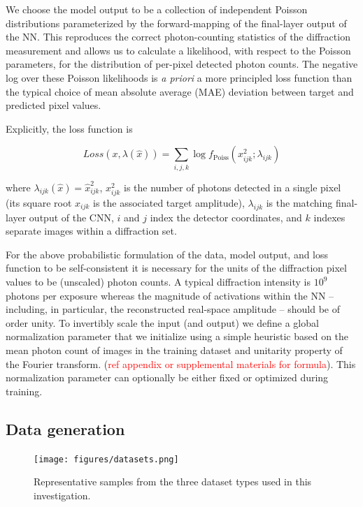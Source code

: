 \documentclass[sn-mathphys]{sn-jnl}%
\theoremstyle{thmstyleone}%
\theoremstyle{thmstyletwo}%
\theoremstyle{thmstylethree}%
\begin{document}
%

We choose the model output to be a collection of independent Poisson distributions parameterized by the forward-mapping of the final-layer output of the NN. This reproduces the correct photon-counting statistics of the diffraction measurement and allows us to calculate a likelihood, with respect to the Poisson parameters, for the distribution of per-pixel detected photon counts. The negative log over these Poisson likelihoods is \emph{a priori} a more principled loss function than the typical choice of mean absolute average (MAE) deviation between target and predicted pixel values.

Explicitly, the loss function is

$$
Loss(x, \lambda(\hat{x})) = \sum_{i,j,k}\log f_{\text{Poiss}}(x_{ijk}^2;\lambda_{ijk})
$$


where $\lambda_{ijk}(\hat{x}) = \hat{x}_{ijk}^2$, $x_{ijk}^2$ is the number of photons detected in a single pixel (its square root $x_{ijk}$ is the associated target amplitude), $\lambda_{ijk}$ is the matching final-layer output of the CNN, $i$ and $j$ index the detector coordinates, and $k$ indexes separate images within a diffraction set. 

For the above probabilistic formulation of the data, model output, and loss function to be self-consistent it is necessary for the units of the diffraction pixel values to be (unscaled) photon counts. A typical diffraction intensity is $10^9$ photons per exposure whereas the magnitude of activations within the NN -- including, in particular, the reconstructed real-space amplitude -- should be of order unity. To invertibly scale the input (and output) we define a global normalization parameter that we initialize using a simple heuristic based on the mean photon count of images in the training dataset and unitarity property of the Fourier transform.  (\textcolor{red}{ref appendix or supplemental materials for formula}). This normalization parameter can optionally be either fixed or optimized during training. 


\subsection{Data generation}\label{data}

\begin{figure}
    \centering
    {{\texttt{[image: figures/datasets.png]} }}%
    \caption{Representative samples from the three dataset types used in this investigation.}%
    \label{fig:datasets}%
\end{figure}
\end{document}
